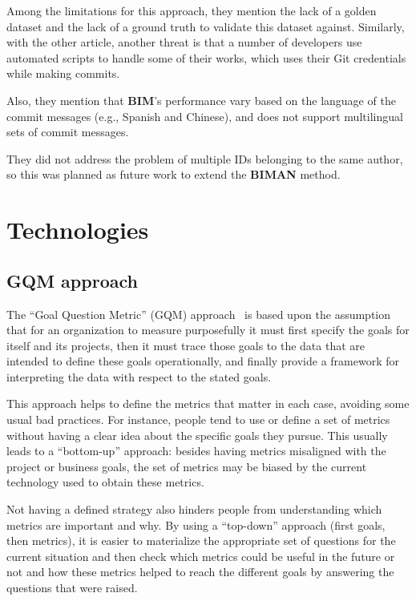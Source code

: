 \documentclass[a4paper, 12pt]{book}
\begin{document}
Among the limitations for this approach, they mention the lack of a golden dataset and the lack of a ground truth to validate this dataset against. Similarly, with the other article, another threat is that a number of developers use automated scripts to handle some of their works, which uses their Git credentials while making commits.

Also, they mention that \textbf{BIM}’s performance vary based on the language of the commit messages (e.g., Spanish and Chinese), and does not support multilingual sets of commit messages.

They did not address the problem of multiple IDs belonging to the same author, so this was planned as future work to extend the \textbf{BIMAN} method.

\section{Technologies}
\label{sec:Technologies}

\subsection{GQM approach}
\label{ssec:gqm-approach}

The ``Goal Question Metric'' (GQM) approach~\cite{Basili94-gqm} is based upon the assumption that for an organization to measure purposefully it must first specify the goals for itself and its projects, then it must trace those goals to the data that are intended to define these goals operationally, and finally provide a framework for interpreting the data with respect to the stated goals.

This approach helps to define the metrics that matter in each case, avoiding some usual bad practices. For instance, people tend to use or define a set of metrics without having a clear idea about the specific goals they pursue. This usually leads to a ``bottom-up'' approach: besides having metrics misaligned with the project or business goals, the set of metrics may be biased by the current technology used to obtain these metrics.

Not having a defined strategy also hinders people from understanding which metrics are important and why. By using a ``top-down'' approach (first goals, then metrics), it is easier to materialize the appropriate set of questions for the current situation and then check which metrics could be useful in the future or not and how these metrics helped to reach the different goals by answering the questions that were raised.
\end{document}
